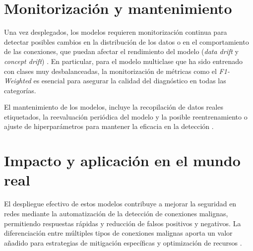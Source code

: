 \section{Monitorización y mantenimiento}
Una vez desplegados, los modelos requieren monitorización continua para detectar posibles cambios en la distribución de los datos o en el comportamiento de las conexiones, que puedan afectar el rendimiento del modelo (\textit{data drift} y \textit{concept drift}) \cite{gama2014survey}. En particular, para el modelo multiclase que ha sido entrenado con clases muy desbalanceadas, la monitorización de métricas como el \textit{F1-Weighted} es esencial para asegurar la calidad del diagnóstico en todas las categorías.

El mantenimiento de los modelos, incluye la recopilación de datos reales etiquetados, la reevaluación periódica del modelo y la posible reentrenamiento o ajuste de hiperparámetros para mantener la eficacia en la detección \cite{tsymbal2004problem}.

\section{Impacto y aplicación en el mundo real}

El despliegue efectivo de estos modelos contribuye a mejorar la seguridad en redes mediante la automatización de la detección de conexiones malignas, permitiendo respuestas rápidas y reducción de falsos positivos y negativos. La diferenciación entre múltiples tipos de conexiones malignas aporta un valor añadido para estrategias de mitigación específicas y optimización de recursos \cite{amershi2019software}.

